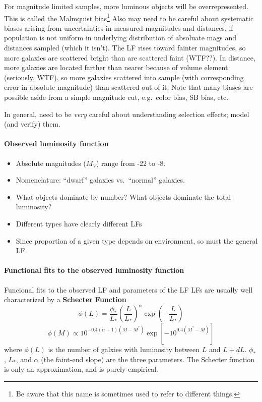 \documentclass{article}
\newcommand{\mynotes}[1]{\textcolor{cadmiumgreen}{#1}}
\begin{document}
For magnitude limited samples, more luminous objects will
be overrepresented. This is called the Malmquist bias\footnote{Be
aware that this name is sometimes used to refer to different things.}
Also may need to be careful about systematic biases arising from
uncertainties in measured magnitudes and distances, if population is
not uniform in underlying distribution of absoluate mags and distances
sampled (which it isn't). The LF rises toward fainter magnitudes, so
more galaxies are scattered bright than are scattered faint
\mynotes{(WTF??)}. In distance, more galaxies are located farther
than nearer because of volume element \mynotes{(seriously, WTF)}, so
more galaxies scattered into sample (with corresponding error in
absolute magnitude) than scattered out of it.
Note that many biases are possible aside from a simple magnitude cut, e.g.\
color bias, SB bias, etc.

In general, need to be \emph{very} careful about
understanding selection effects; model (and verify) them.

\paragraph{Observed luminosity function}
\begin{itemize}
    \item Absolute magnitudes ($M_{V}$) range from -22 to -8.
    \item Nomenclature: ``dwarf'' galaxies vs.\ ``normal'' galaxies.
    \item What objects dominate by number? What objects dominate the
        total luminosity?
    \item Different types have clearly different LFs
    \item Since proportion of a given type depends on environment, so
        must the general LF.
\end{itemize}

\paragraph{Functional fits to the observed luminosity function}
Funcional fits to the observed LF and parameters of the LF
LFs are usually well characterized by a \textbf{Schecter Function}
\[
    \phi(L) = \frac{\phi_{*}}{L_{*}} \left( \frac{L}{L_{*}} \right) ^{\alpha}
    \exp\left( -\frac{L}{L_{*}} \right)
    \]
\[
    \phi(M) \propto 10^{ -0.4 \left( \alpha + 1 \right)
    \left( M - M^{*} \right) }
    \exp \left[ -10^{ 0.4(M^{*} - M) } \right]
    \]
where $\phi(L)$ is the number of galxies with luminosity between
$L$ and $L + dL$.  $\phi_{*}$, $L_{*}$, and $\alpha$ (the faint-end slope)
are the three parameters. The Schecter function is only an approximation, and
is purely empirical.
\end{document}
